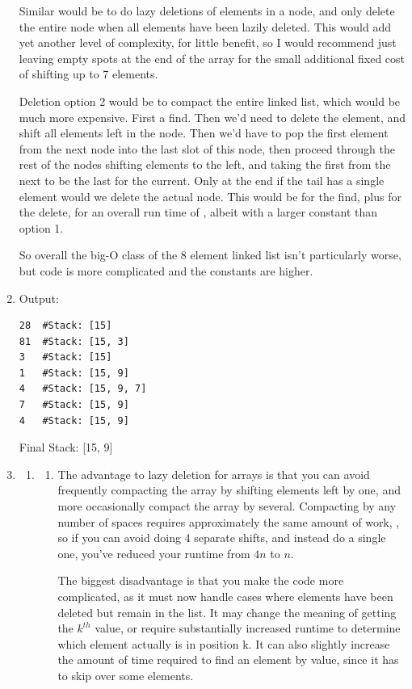 \documentclass[12pt]{chmullighw}
\begin{document}
\begin{enumerate}
Similar would be to do lazy deletions of elements in a node, and only
delete the entire node when all elements have been lazily deleted. This would
add yet another level of complexity, for little benefit, so I would recommend
just leaving empty spots at the end of the array for the small additional fixed
cost of shifting up to 7 elements.

Deletion option 2 would be to compact the entire linked list, which would be much
more expensive. First a  find. Then we'd need to delete the element, and
shift all elements left in the node. Then we'd have to pop the first element from
the next node into the last slot of this node, then proceed through the rest of
the nodes shifting elements to the left, and taking the first from the next to be
the last for the current. Only at the end if the tail has a single element would we
delete the actual node. This would be  for the find, plus  for the
delete, for an overall run time of , albeit with a larger constant than
option 1. 

So overall the big-O class of the 8 element linked list isn't particularly worse,
but code is more complicated and the constants are higher.


\item 
Output:
\begin{verbatim}
28  #Stack: [15]
81  #Stack: [15, 3]
3   #Stack: [15]
1   #Stack: [15, 9]
4   #Stack: [15, 9, 7]
7   #Stack: [15, 9]
4   #Stack: [15, 9]
\end{verbatim}

Final Stack: [15, 9]


\item \begin{enumerate} \renewcommand{\labelenumii}{\arabic{enumii}.}
\item \begin{enumerate} \renewcommand{\labelenumiii}{\arabic{enumiii}.}
\item The advantage to lazy deletion for arrays is that you can avoid frequently
compacting the array by shifting elements left by one, and more occasionally
compact the array by several. Compacting by any number of spaces requires
approximately the same amount of work, , so if you can avoid doing 4
separate  shifts, and instead do a single one, you've reduced your runtime
from $4n$ to $n$.

The biggest disadvantage is that you make the code more complicated, as it must
now handle cases where elements have been deleted but remain in the list. It may
change the meaning of getting the $k^{th}$ value, or require substantially
increased runtime to determine which element actually is in position k. It can 
also slightly increase the amount of time required to find an element by value, since it has to skip over some elements.


\end{enumerate}
\end{enumerate}
\end{enumerate}
\end{document}
